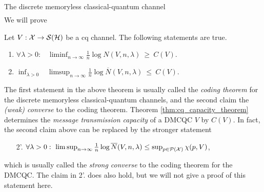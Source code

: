 \begin{section}{The discrete memoryless  classical-quantum channel}
\begin{align}
	\end{align}
	We will prove 
	\begin{theorem} \label{thm:cq_capacity_theorem}
		Let $V: {\mathcal X} \rightarrow {\mathcal S}({\mathcal H})$ be a cq channel. The following statements are true.
		\begin{enumerate}
			\item $\forall \lambda > 0:$ \ $\liminf_{n \rightarrow \infty} \frac{1}{n} \log N(V,n,\lambda) \ \geq \ C(V)$. \label{thm:cq_capacity_theorem_1}
			\item $\inf_{\lambda > 0}$ \ $\limsup_{n \rightarrow \infty} \frac{1}{n} \log \overline{N}(V,n,\lambda) \ \leq \ C(V)$. \label{thm:cq_capacity_theorem_2}
		\end{enumerate}
	\end{theorem}
	The first statement in the above theorem is usually called the \emph{coding theorem} for the discrete memoryless classical-quantum channels, and the second claim the \emph{(weak) converse}
	to the coding theorem. \newline 
	Theorem \ref{thm:cq_capacity_theorem} determines the \emph{message transmission capacity} of a DMCQC $V$ by $C(V)$. \newline 
	In fact, the second claim above can be replaced by the stronger statement 
	\begin{enumerate}
		\item [2'.]$\forall \lambda > 0: \ \limsup_{n \rightarrow \infty} \frac{1}{n} \log \overline{N}(V,n,\lambda) \leq \sup_{p \in {\mathcal P}({\mathcal X})} \chi(p,V)$, \label{thm:cq_capacity_theorem_3}
	\end{enumerate}
	which is usually called the \emph{strong converse} to the coding theorem for the DMCQC. The claim in 2'. does also hold, but we will not give a proof of this statement here. 

\end{section}
